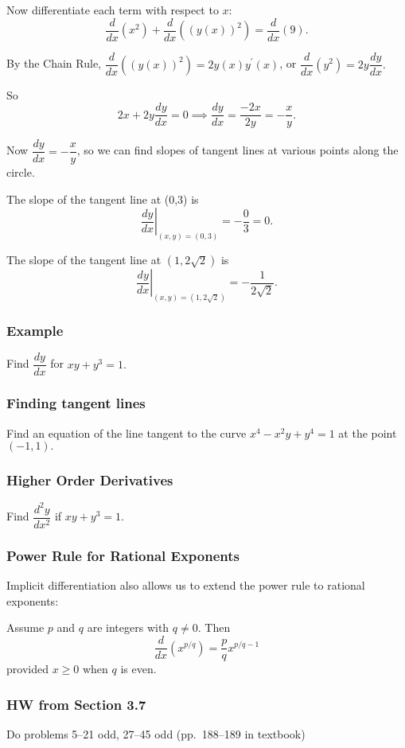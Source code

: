 \documentclass[14pt]{beamer}
\begin{document}
\begin{frame}
\small
Now differentiate each term with respect to $x$:
$$\frac{d}{dx} (x^2) + \frac{d}{dx} ((y(x))^2) = \frac{d}{dx}(9).$$

\bigskip

By the Chain Rule, $\dfrac{d}{dx}((y(x))^2)=2y(x) y^{\prime}(x)$, or $\dfrac{d}{dx}(y^2)=2y \dfrac{dy}{dx}.$

\bigskip

So
$$2x+2y \dfrac{dy}{dx}=0 \implies \dfrac{dy}{dx}=\dfrac{-2x}{2y}=-\dfrac{x}{y}.$$
\end{frame}

\begin{frame}
\small
Now $\dfrac{dy}{dx}=-\dfrac{x}{y}$, so we can find slopes of tangent lines at various points along the circle.

\bigskip

The slope of the tangent line at (0,3) is 
\[\left. \dfrac{dy}{dx} \right|_{(x,y)=(0,3)} = -\dfrac{0}{3}=0.\]

\bigskip

The slope of the tangent line at $(1,2\sqrt{2})$ is
\[\left. \dfrac{dy}{dx} \right|_{(x,y)=(1,2\sqrt{2})} = -\dfrac{1}{2\sqrt{2}}.\]
\end{frame}

\begin{frame}%
\frametitle{Example}
Find $\dfrac{dy}{dx}$ for $xy+y^3=1.$
\end{frame}

\begin{frame}%
\frametitle{Finding tangent lines}
Find an equation of the line tangent to the curve $x^4-x^2 y+y^4=1$ at the point $(-1,1).$
\end{frame}

\begin{frame}%
\frametitle{Higher Order Derivatives}
Find $\dfrac{d^2 y}{dx^2}$ if $xy+y^3=1.$
\end{frame}

\begin{frame}
\frametitle{Power Rule for Rational Exponents}
Implicit differentiation also allows us to extend the power rule to rational exponents:

\bigskip

Assume $p$ and $q$ are integers with $q \ne 0$.  Then 
$$\frac{d}{dx} (x^{p/q})=\frac{p}{q} x^{p/q-1}$$
provided $x \ge 0$ when $q$ is even.
\end{frame}

\begin{frame}
\frametitle{HW from Section 3.7}

Do problems 5--21 odd, 27--45 odd (pp.\ 188--189 in textbook)
\end{frame}

\begin{comment}
\end{comment}
\end{document}
